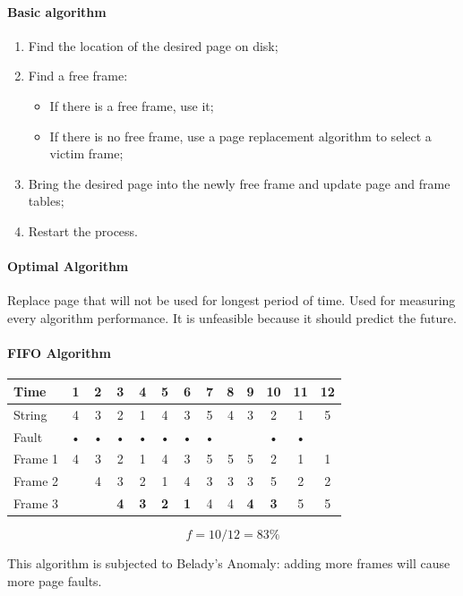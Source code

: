 \paragraph{Basic algorithm}
\begin{enumerate}
\item Find the location of the desired page on disk;
\item Find a free frame:
\begin{itemize}
\item If there is a free frame, use it;
\item If there is no free frame, use a page replacement algorithm to select a victim frame;
\end{itemize}
\item Bring the desired page into the newly free frame and update page and frame tables;
\item Restart the process.
\end{enumerate}

\paragraph{Optimal Algorithm}
Replace page that will not be used for longest period of time. Used for measuring every algorithm performance. It is unfeasible because it should predict the future.

\paragraph{FIFO Algorithm}
\begin{center}
\begin{tabular}{l|cccccccccccc}
\hline 
Time & 1 & 2 & 3 & 4 & 5 & 6 & 7 & 8 & 9 & 10 & 11 & 12 \\ 
\hline 
String & 4 & 3 & 2 & 1 & 4 & 3 & 5 & 4 & 3 & 2 & 1 & 5 \\ 
\hline 
Fault & • & • & • & • & • & • & • &  &  & • & • &  \\ 
\hline 
Frame 1 & 4 & 3 & 2 & 1 & 4 & 3 & 5 & 5 & 5 & 2 & 1 & 1 \\ 
Frame 2 & & 4 & 3 & 2 & 1 & 4 & 3 & 3 & 3 & 5 & 2 & 2 \\ 
Frame 3 &  &  & \textbf{4} & \textbf{3} & \textbf{2} & \textbf{1} & 4 & 4 & \textbf{4} & \textbf{3} & 5 & 5 \\
\hline
\end{tabular}
\[ f = 10/12 = 83 \% \]
\end{center}
This algorithm is subjected to Belady's Anomaly: adding more frames will cause more page faults.

